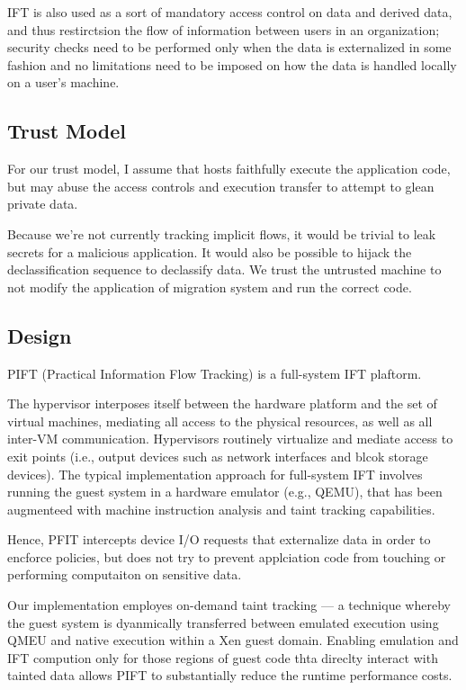 IFT is also used as a sort of mandatory access control on data and derived data,
and thus restirctsion the flow of information between users in an
organization; security checks need to be performed only when the data is
externalized in some fashion and no limitations need to be imposed on how
the data is handled locally on a user's machine.  


\subsection{Trust Model}
For our trust model, I assume that hosts faithfully execute the application
code, but may abuse the access controls and execution transfer to attempt to
glean private data.


Because we're not currently tracking implicit flows, it would be trivial to
leak secrets for a malicious application.  
%
It would also be possible to hijack the declassification sequence to declassify
data.   We trust the untrusted machine to not modify the application of
migration system and run the correct code.


\subsection{Design}

PIFT (Practical Information Flow Tracking) is a full-system IFT plaftorm.

The hypervisor interposes itself between the hardware platform and the set of
virtual machines, mediating all access to the physical resources, as well as
all inter-VM communication.
%
Hypervisors routinely virtualize and mediate access to exit points (i.e.,
output devices such as network interfaces and blcok storage devices).
%
The typical implementation approach for full-system IFT involves running the
guest system in a hardware emulator (e.g., QEMU), that has been augmenteed
with machine instruction analysis and taint tracking capabilities.

%
Hence, PFIT intercepts device I/O requests that externalize data in order to
encforce policies, but does not try to prevent applciation code from touching
or performing computaiton on sensitive data.


Our implementation employes on-demand taint tracking --- a technique whereby
the guest system is dyanmically transferred between emulated execution using
QMEU and native execution within a Xen guest domain. Enabling emulation and IFT
compution only for those regions of guest code thta direclty interact with
tainted data allows PIFT to substantially reduce the runtime performance costs.

